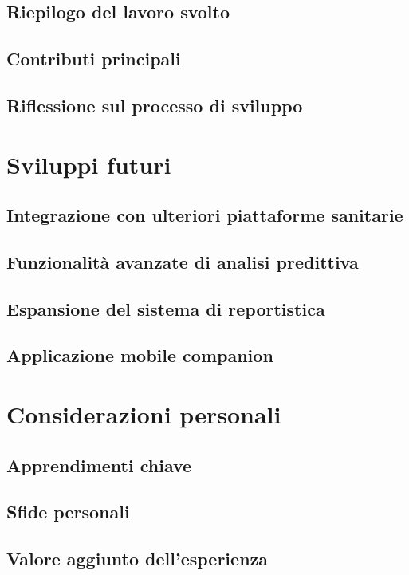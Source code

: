 \documentclass[12pt,a4paper,oneside]{report}
\begin{document}
\subsection{Riepilogo del lavoro svolto}

\subsection{Contributi principali}

\subsection{Riflessione sul processo di sviluppo}

\section{Sviluppi futuri}
\subsection{Integrazione con ulteriori piattaforme sanitarie}

\subsection{Funzionalità avanzate di analisi predittiva}

\subsection{Espansione del sistema di reportistica}

\subsection{Applicazione mobile companion}

\section{Considerazioni personali}
\subsection{Apprendimenti chiave}

\subsection{Sfide personali}

\subsection{Valore aggiunto dell'esperienza}
\end{document}
